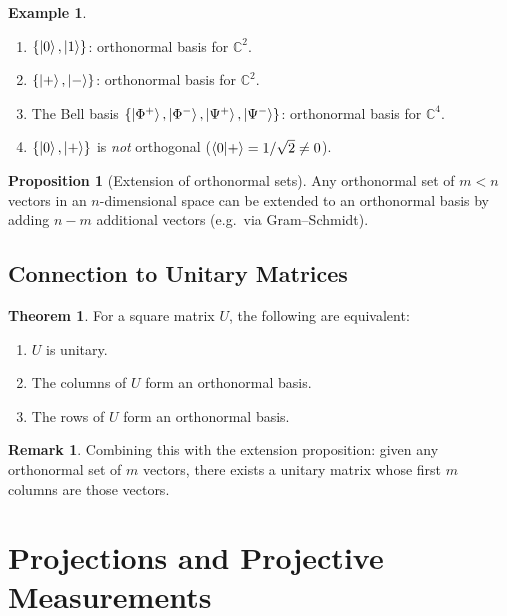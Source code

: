 \documentclass[11pt]{article}
\theoremstyle{definition}
\newtheorem{example}{Example}[section]
\newtheorem{remark}{Remark}[section]
\newtheorem{proposition}{Proposition}[section]
\newtheorem{theorem}{Theorem}[section]
\begin{document}
\begin{example}\leavevmode
\begin{enumerate}
    \item $\{\ket{0},\ket{1}\}$: orthonormal basis for $\mathbb{C}^2$.
    \item $\{\ket{+},\ket{-}\}$: orthonormal basis for $\mathbb{C}^2$.
    \item The Bell basis $\{\ket{\Phi^+},\ket{\Phi^-},\ket{\Psi^+},\ket{\Psi^-}\}$: orthonormal basis for $\mathbb{C}^4$.
    \item $\{\ket{0},\ket{+}\}$ is \emph{not} orthogonal ($\braket{0}{+}=1/\sqrt{2}\neq 0$).
\end{enumerate}
\end{example}

\begin{proposition}[Extension of orthonormal sets]
Any orthonormal set of $m<n$ vectors in an $n$-dimensional space can be extended to an orthonormal basis by adding $n-m$ additional vectors (e.g.\ via Gram--Schmidt).
\end{proposition}

\subsection{Connection to Unitary Matrices}

\begin{theorem}
For a square matrix $U$, the following are equivalent:
\begin{enumerate}[label=(\roman*)]
    \item $U$ is unitary.
    \item The columns of $U$ form an orthonormal basis.
    \item The rows of $U$ form an orthonormal basis.
\end{enumerate}
\end{theorem}

\begin{remark}
Combining this with the extension proposition: given any orthonormal set of $m$ vectors, there exists a unitary matrix whose first $m$ columns are those vectors.
\end{remark}

\section{Projections and Projective Measurements}
\end{document}

